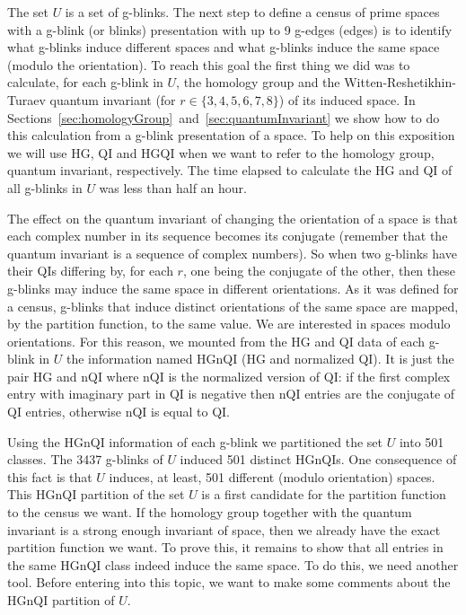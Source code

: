 The set $U$ is a  set of g-blinks. The next step to define
a census of prime spaces with a g-blink (or blinks) presentation
with up to 9 g-edges (edges) is to identify what g-blinks induce
different spaces and what g-blinks induce the same space
(modulo the orientation). To reach
this goal the first thing we did was to
calculate, for each g-blink in $U$, the homology group and the
Witten-Reshetikhin-Turaev quantum invariant (for
$r \in \{3,4,5,6,7,8\}$) of its induced space. In
Sections~\ref{sec:homologyGroup}~and~\ref{sec:quantumInvariant}
we show how to do this calculation from a g-blink
presentation of a space. To help on this exposition
we will use HG, QI and HGQI when we want to refer
to the homology group, quantum invariant, respectively.
The time elapsed to calculate the HG and QI of all
g-blinks in $U$ was less than half an hour.

The effect on the quantum invariant of changing the
orientation of a space is that each complex number in
its sequence becomes its conjugate (remember that the
quantum invariant is a sequence of complex numbers). So
when two g-blinks have their QIs differing by, for each
$r$, one being the conjugate of the other, then these
g-blinks may induce the same space in different
orientations. As it was defined for a census, g-blinks
that induce distinct orientations of the same space are
mapped, by the partition function, to the same value. We
are interested in spaces modulo orientations. For this
reason, we mounted from the HG and QI data of each
g-blink in $U$ the information named HGnQI (HG and
normalized QI). It is just the pair HG and nQI where
nQI is the normalized version of QI: if the first complex
entry with imaginary part in QI is negative then nQI
entries are the conjugate of QI entries, otherwise nQI
is equal to QI.

Using the HGnQI information of each g-blink we partitioned the
set $U$ into 501 classes. The 3437 g-blinks of $U$ induced 501
distinct HGnQIs. One consequence of this fact is that $U$ induces, at
least, 501 different (modulo orientation) spaces. This HGnQI partition
of the set $U$ is a first candidate for the partition function
to the census we want. If the homology group together with
the quantum invariant is a strong enough invariant of space,
then we already have the exact partition function we want. To
prove this, it remains to show that all entries in the
same HGnQI class indeed induce the same space. To do
this, we need another tool. Before entering into this topic,
we want to make some comments about the HGnQI partition of $U$.

